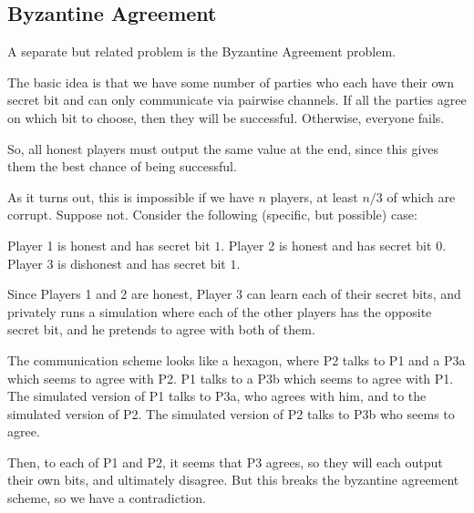 \documentclass[11pt]{article}
\begin{document}
\subsection{Byzantine Agreement}
A separate but related problem is the Byzantine Agreement problem.

The basic idea is that we have some number of parties who each have their own secret bit and can only communicate via pairwise channels.
If all the parties agree on which bit to choose, then they will be successful.
Otherwise, everyone fails.

So, all honest players must output the same value at the end, since this gives them the best chance of being successful.\smallskip

As it turns out, this is impossible if we have \(n\) players, at least \(n/3\) of which are corrupt.
Suppose not. Consider the following (specific, but possible) case:

Player 1 is honest and has secret bit \(1\).
Player 2 is honest and has secret bit \(0\).
Player 3 is dishonest and has secret bit \(1\).

Since Players 1 and 2 are honest, Player 3 can learn each of their secret bits, and privately runs a simulation where each of the other players has the opposite secret bit, and he pretends to agree with both of them. 

The communication scheme looks like a hexagon, where P2 talks to P1 and a P3a which seems to agree with P2. P1 talks to a P3b which seems to agree with P1. The simulated version of P1 talks to P3a, who agrees with him, and to the simulated version of P2. The simulated version of P2 talks to P3b who seems to agree.

Then, to each of P1 and P2, it seems that P3 agrees, so they will each output their own bits, and ultimately disagree.
But this breaks the byzantine agreement scheme, so we have a contradiction.
\end{document}
